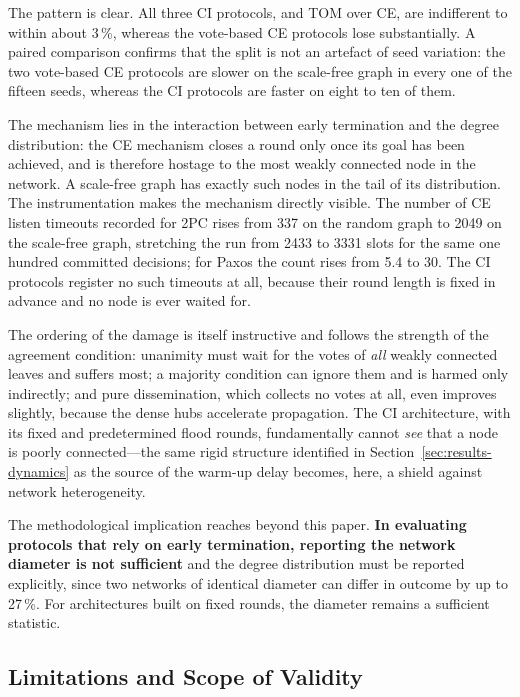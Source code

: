 \documentclass[journal]{IEEEtran}
\newcommand{\CI}{CI}                      %
\newcommand{\CE}{CE}                      %
\begin{document}
The pattern is clear. All three \CI{} protocols, and TOM over \CE, are
indifferent to within about 3\,\%, whereas the vote-based \CE{} protocols
lose substantially. A paired comparison confirms that the split is not an
artefact of seed variation: the two vote-based \CE{} protocols are slower on
the scale-free graph in every one of the fifteen seeds, whereas the \CI{}
protocols are faster on eight to ten of them.

The mechanism lies in the interaction between early termination and the
degree distribution: the \CE{} mechanism closes a round only once its goal
has been achieved, and is therefore hostage to the most weakly connected node
in the network. A scale-free graph has exactly such nodes in the tail of its
distribution. The instrumentation makes the mechanism directly visible. The
number of \CE{} listen timeouts recorded for 2PC rises from 337 on the random
graph to 2049 on the scale-free graph, stretching the run from 2433 to 3331
slots for the same one hundred committed decisions; for Paxos the count rises
from 5.4 to 30. The \CI{} protocols register no such timeouts at all, because
their round length is fixed in advance and no node is ever waited for.

The ordering of the damage is itself instructive and follows the strength
of the agreement condition: unanimity must wait for the votes of
\emph{all} weakly connected leaves and suffers most; a majority condition
can ignore them and is harmed only indirectly; and pure dissemination,
which collects no votes at all, even improves slightly, because the dense
hubs accelerate propagation. The \CI{} architecture, with its fixed and
predetermined flood rounds, fundamentally cannot \emph{see} that a node is
poorly connected---the same rigid structure identified in
Section~\ref{sec:results-dynamics} as the source of the warm-up delay
becomes, here, a shield against network heterogeneity.

The methodological implication reaches beyond this paper.
\textbf{In evaluating protocols that rely on early termination, reporting
the network diameter is not sufficient} and the degree distribution must
be reported explicitly, since two networks of identical diameter can
differ in outcome by up to 27\,\%. For architectures built on fixed rounds,
the diameter remains a sufficient statistic.

\subsection{Limitations and Scope of Validity}
\label{sec:results-limitations}
\end{document}
